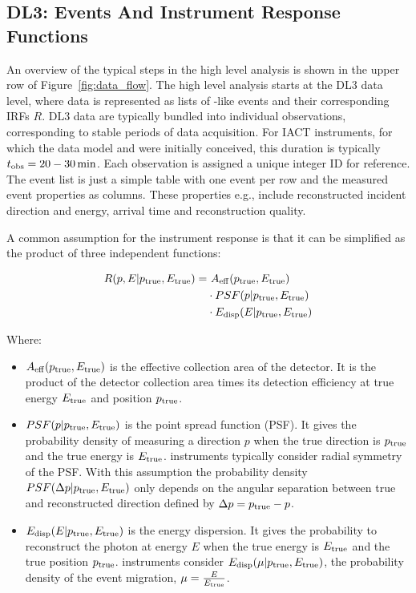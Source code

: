 \documentclass[longauth]{aa}
\begin{document}
\subsection{DL3: Events And Instrument Response Functions}
An overview of the typical steps in the high level analysis is shown in the upper
row of Figure~\ref{fig:data_flow}. The high level analysis starts at the DL3 
data level, where \gammaray data is represented as lists of \gammaray-like events and their
corresponding IRFs $R$. DL3 data are typically bundled into individual observations, corresponding to
stable periods of data acquisition. For IACT instruments, for which the \gadf
data model and \gammapy were initially conceived, this duration is typically 
$t_{\rm obs}=20 - 30\,{\rm min}$. Each observation is assigned a unique integer ID for reference.
The event list is just a simple table with one event per row and
the measured event properties as columns. These properties e.g., include reconstructed
incident direction and energy, arrival time and reconstruction quality.

A common assumption for the instrument response is that it can be simplified as the product 
of three independent functions:

\begin{equation}
	\begin{split}
   R(p, E|p_{\rm true}, E_{\rm true}) = &~A_{\rm eff}(p_{\rm true}, E_{\rm true}) \\
	& \cdot PSF(p|p_{\rm true}, E_{\rm true})\\
    & \cdot E_{\rm disp}(E|p_{\rm true}, E_{\rm true})
	\end{split}
\end{equation}

\noindent Where:
\begin{itemize}
\setlength\itemsep{1em}
\item $A_{\rm eff}(p_{\rm true}, E_{\rm true})$ is the effective collection area of the detector. It is the product
  of the detector collection area times its detection efficiency at true energy $E_{\rm true}$ and position $p_{\rm true}$.
\item $PSF(p|p_{\rm true}, E_{\rm true})$ is the point spread function (PSF). It gives the probability density of
  measuring a direction $p$ when the true direction is $p_{\rm true}$ and the true energy is $E_{\rm true}$.
  \gammaray instruments typically consider radial symmetry of the PSF. With this assumption the probability density 
  $PSF(\Delta p|p_{\rm true}, E_{\rm true})$ only depends on the angular separation between true
 and reconstructed direction defined by $\Delta p = p_{\rm true} - p$.  
\item $E_{\rm disp}(E|p_{\rm true}, E_{\rm true})$ is the energy dispersion. It gives the probability to
  reconstruct the photon at energy $E$ when the true energy is $E_{\rm true}$ and the true position $p_{\rm true}$.
  \gammaray instruments consider $E_{\rm disp}(\mu|p_{\rm true}, E_{\rm true})$, the probability density of the event
  migration, $\mu=\frac{E}{E_{\rm true}}$.
\end{itemize}
\end{document}
